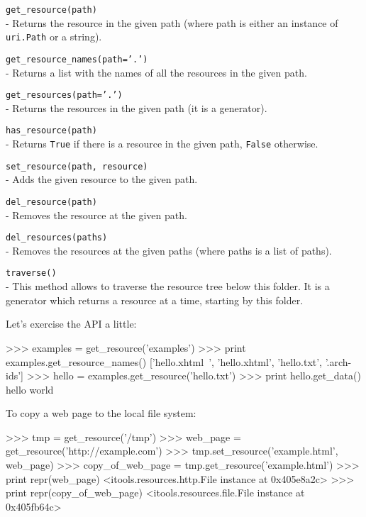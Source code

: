 \begin{api}
  {\tt get\_resource(path)}\\
  - Returns the resource in the given path (where path is either an instance
    of {\tt uri.Path} or a string).

  {\tt get\_resource\_names(path='.')}\\
  - Returns a list with the names of all the resources in the given path.

  {\tt get\_resources(path='.')}\\
  - Returns the resources in the given path (it is a generator).

  {\tt has\_resource(path)}\\
  - Returns {\tt True} if there is a resource in the given path, {\tt False}
    otherwise.

  {\tt set\_resource(path, resource)}\\
  - Adds the given resource to the given path.

  {\tt del\_resource(path)}\\
  - Removes the resource at the given path.

  {\tt del\_resources(paths)}\\
  - Removes the resources at the given paths (where paths is a list of paths).

  {\tt traverse()}\\
  - This method allows to traverse the resource tree below this folder. It
    is a generator which returns a resource at a time, starting by this
    folder.
\end{api}

Let's exercise the API a little:

\begin{code}
    >>> examples = get_resource('examples')
    >>> print examples.get_resource_names()
    ['hello.xhtml~', 'hello.xhtml', 'hello.txt', '.arch-ids']
    >>> hello = examples.get_resource('hello.txt')
    >>> print hello.get_data()
    hello world
\end{code}

To copy a web page to the local file system:

\begin{code}
    >>> tmp = get_resource('/tmp')
    >>> web_page = get_resource('http://example.com')
    >>> tmp.set_resource('example.html', web_page)
    >>> copy_of_web_page = tmp.get_resource('example.html')
    >>> print repr(web_page)
    <itools.resources.http.File instance at 0x405e8a2c>
    >>> print repr(copy_of_web_page)
    <itools.resources.file.File instance at 0x405fb64c>
\end{code}

